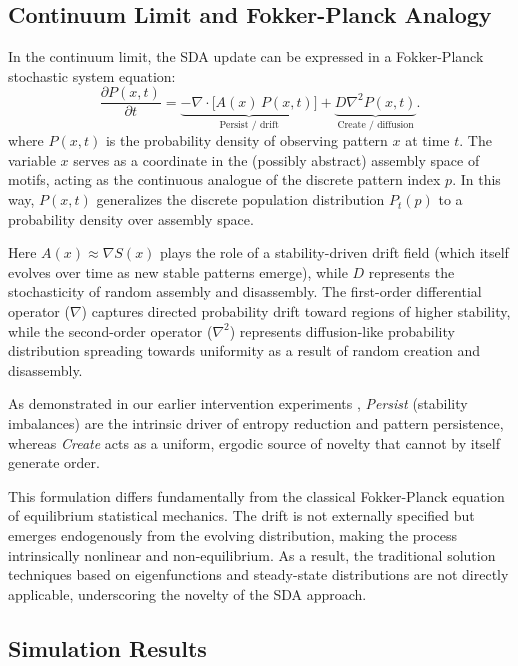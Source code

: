\documentclass[life,article,submit,pdftex,moreauthors]{Definitions/mdpi}
\begin{document}
\subsection{Continuum Limit and Fokker-Planck Analogy}

In the continuum limit, the SDA update can be expressed in a Fokker-Planck \cite{gardiner2009} stochastic system equation:
\begin{equation}
\frac{\partial P(x,t)}{\partial t}
= \underbrace{- \nabla \cdot \big[ A(x)\, P(x,t) \big]}_{\text{Persist / drift}}
+ \underbrace{D \nabla^2 P(x,t)}_{\text{Create / diffusion}}.
\end{equation}
where $P(x,t)$ is the probability density of observing pattern $x$ at time $t$. 
The variable $x$ serves as a coordinate in the (possibly abstract) assembly space 
of motifs, acting as the continuous analogue of the discrete pattern index $p$. 
In this way, $P(x,t)$ generalizes the discrete population distribution $P_t(p)$ 
to a probability density over assembly space.


Here $A(x) \approx \nabla S(x)$ plays the role of a stability-driven drift 
field (which itself evolves over time as new stable patterns emerge), while 
$D$ represents the stochasticity of random assembly and disassembly. The first-order differential operator ($\nabla$) captures directed probability drift toward 
regions of higher stability, while the second-order operator ($\nabla^2$) 
represents diffusion-like probability distribution spreading towards uniformity
as a result of random creation and disassembly.

As demonstrated in our earlier intervention experiments \cite{adler_sda}, 
\textit{Persist} (stability imbalances) are the intrinsic driver of entropy 
reduction and pattern persistence, whereas \textit{Create} acts as a 
uniform, ergodic source of novelty that cannot by itself generate order.  

This formulation differs fundamentally from the classical Fokker-Planck 
equation of equilibrium statistical mechanics. The drift is not externally 
specified but emerges endogenously from the evolving distribution, making the 
process intrinsically nonlinear and non-equilibrium. As a result, the 
traditional solution techniques based on eigenfunctions and steady-state 
distributions are not directly applicable, underscoring the novelty of the SDA 
approach.


\subsection{Simulation Results}
\end{document}
